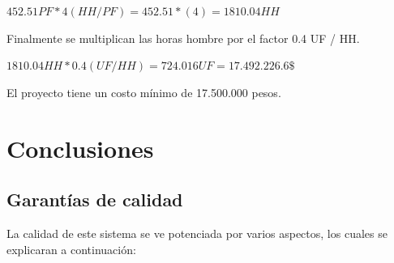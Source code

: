 \documentclass[a4paper,12pt,openany,oneside]{book}
\begin{document}
\begin{math}
452.51 PF * 4 (HH / PF) = 452.51 * (4) = 1810.04 HH
\end{math}

Finalmente se multiplican las horas hombre por el factor 0.4 UF / HH.

\begin{math}
1810.04 HH * 0.4(UF / HH) = 724.016 UF = 17.492.226.6 \$
\end{math}

El proyecto tiene un costo mínimo de 17.500.000 pesos.

\chapter{Conclusiones}

\section{Garantías de calidad}

La calidad de este sistema se ve potenciada por varios aspectos, los cuales se explicaran a continuación:
\end{document}
